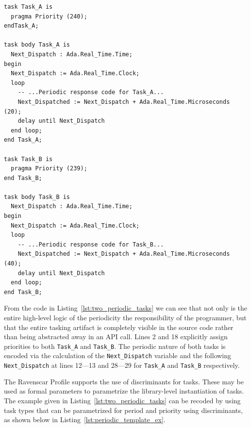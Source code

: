 \begin{minipage}{\listingwidth}
\lstset{language=ada,
  numbers=left,
  numberstyle=\tiny
}
\begin{lstlisting}[firstnumber=1, label=lst:two_periodic_tasks,
    caption=Two Ravenscar periodic tasks with periods of 20 msec and
    40 msec and priorities of 240 and 239.]
task Task_A is 
  pragma Priority (240);
endTask_A;

task body Task_A is
  Next_Dispatch : Ada.Real_Time.Time;
begin
  Next_Dispatch := Ada.Real_Time.Clock;
  loop
    -- ...Periodic response code for Task_A...
    Next_Dispatched := Next_Dispatch + Ada.Real_Time.Microseconds (20);
    delay until Next_Dispatch
  end loop;
end Task_A;

task Task_B is
  pragma Priority (239);
end Task_B;

task body Task_B is
  Next_Dispatch : Ada.Real_Time.Time;
begin
  Next_Dispatch := Ada.Real_Time.Clock;
  loop
    -- ...Periodic response code for Task_B...
    Next_Dispatched := Next_Dispatch + Ada.Real_Time.Microseconds (40);
    delay until Next_Dispatch
  end loop;
end Task_B;
\end{lstlisting}
\end{minipage}

From the code in Listing~\ref{lst:two_periodic_tasks} we can see that
not only is the entire high-level logic of the periodicity the
responsibility of the programmer, but that the entire tasking artifact
is completely visible in the source code rather than being abstracted
away in an API call. Lines 2 and 18 explicitly assign priorities to
both \texttt{Task\_A} and \texttt{Task\_B}. The periodic nature of
both tasks is encoded via the calculation of the
\texttt{Next\_Dispatch} variable and the following 
\texttt{Next\_Dispatch} at lines 12---13 and 28---29 for
\texttt{Task\_A} and \texttt{Task\_B} respectively.

The Ravenscar Profile supports the use of discriminants for tasks.
These may be used as formal parameters to parametrize the
library-level instantiation of tasks. The example given in
Listing~\ref{lst:two_periodic_tasks} can be recoded by using task
types that can be parametrized for period and priority using
discriminants, as shown below in
Listing~\ref{lst:periodic_template_ex}.

